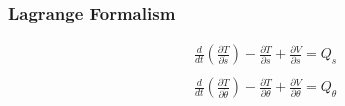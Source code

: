 

\begin{frame}
	\frametitle{Lagrange Formalism}
	
	\begin{align*}
	  &\frac{d}{dt}\left(\frac{\partial T}{\partial \dot{s}}\right) -
	  \frac{\partial T}{\partial s} +
	  \frac{\partial V}{\partial s}
	  = Q_s \\
	  &{}\\
	  &\frac{d}{dt}\left(\frac{\partial T}{\partial \dot{\theta}}\right) -
	  \frac{\partial T}{\partial \theta} +
	  \frac{\partial V}{\partial \theta}
	  = Q_{\theta} \\
	\end{align*}
\end{frame}

